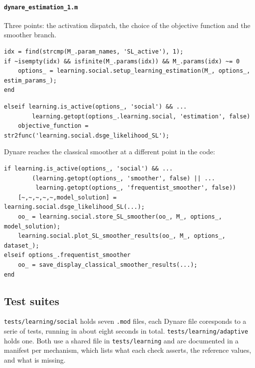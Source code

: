 \documentclass[11pt,a4paper]{article}
\newcommand{\file}[1]{\texttt{#1}}
\begin{document}
\paragraph{\file{dynare\_estimation\_1.m}} Three points: the activation
dispatch, the choice of the objective function and the smoother branch.

\begin{lstlisting}[style=matlab]
% activation dispatch, mirroring stoch_simul
idx = find(strcmp(M_.param_names, 'SL_active'), 1);
if ~isempty(idx) && isfinite(M_.params(idx)) && M_.params(idx) ~= 0
    options_ = learning.social.setup_learning_estimation(M_, options_, estim_params_);
end
\end{lstlisting}

\begin{lstlisting}[style=matlab]
% objective function
elseif learning.is_active(options_, 'social') && ...
        learning.getopt(options_.learning.social, 'estimation', false)
    objective_function = str2func('learning.social.dsge_likelihood_SL');
\end{lstlisting}

\medskip
\noindent
Dynare reaches the classical smoother at a different point in the code:

\begin{lstlisting}[style=matlab]
if learning.is_active(options_, 'social') && ...
        (learning.getopt(options_, 'smoother', false) || ...
         learning.getopt(options_, 'frequentist_smoother', false))
    [~,~,~,~,~,model_solution] = learning.social.dsge_likelihood_SL(...);
    oo_ = learning.social.store_SL_smoother(oo_, M_, options_, model_solution);
    learning.social.plot_SL_smoother_results(oo_, M_, options_, dataset_);
elseif options_.frequentist_smoother
    oo_ = save_display_classical_smoother_results(...);
end
\end{lstlisting}


\subsection{Test suites}
\label{app:architecture:tests}

\file{tests/learning/social} holds seven \file{.mod} files, each Dynare file coresponds to a serie of tests, running in about eight seconds in total.
\file{tests/learning/adaptive} holds one. Both use a shared file in
\file{tests/learning} and are documented in a manifest per mechanism, which
lists what each check asserts, the reference values, and what is missing. 
\end{document}
